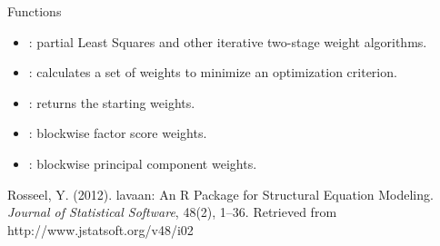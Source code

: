 \documentclass[a4paper]{book}
\begin{document}
\begin{Section}{Functions}
\begin{itemize}

\item{} : partial Least Squares and other iterative two-stage weight algorithms.

\item{} : calculates a set of weights to minimize an optimization criterion.

\item{} : returns the starting weights.

\item{} : blockwise factor score weights.

\item{} : blockwise principal component weights.

\end{itemize}
\end{Section}
%
\begin{References}\relax
Rosseel, Y. (2012). lavaan: An R Package for Structural Equation Modeling. \emph{Journal of Statistical Software}, 48(2), 1–36. Retrieved from http://www.jstatsoft.org/v48/i02
\end{References}
%
\end{document}

